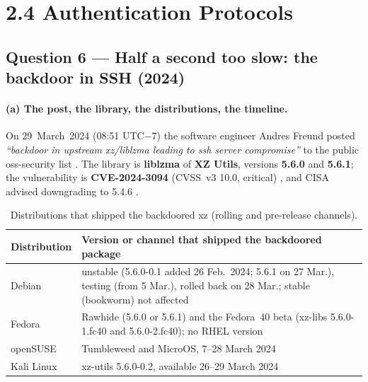 \documentclass[11pt,a4paper]{article}
\begin{document}
\section*{2.4 Authentication Protocols}

\subsection*{Question 6 --- Half a second too slow: the backdoor in SSH (2024)}

\paragraph{(a) The post, the library, the distributions, the timeline.} On 29~March~2024 (08:51 UTC$-$7) the software engineer
Andres Freund posted \emph{``backdoor in upstream xz/liblzma leading to ssh server compromise''} to the public oss-security
list \cite{freund}. The library is \textbf{liblzma} of \textbf{XZ Utils}, versions \textbf{5.6.0} and \textbf{5.6.1}; the
vulnerability is \textbf{CVE-2024-3094} (CVSS~v3 10.0, critical) \cite{nvd}, and CISA advised downgrading to 5.4.6 \cite{cisaxz}.
\begin{table}[H]
\centering\small
\begin{tabularx}{\textwidth}{@{}P{3.4cm}L@{}}
\toprule
Distribution & Version or channel that shipped the backdoored package \\
\midrule
Debian & unstable (5.6.0-0.1 added 26 Feb.\ 2024; 5.6.1 on 27 Mar.), testing (from 5 Mar.), rolled back on 28 Mar.; stable (bookworm) not affected
\cite{cox,debian} \\
Fedora & Rawhide (5.6.0 or 5.6.1) and the Fedora~40 beta (xz-libs 5.6.0-1.fc40 and 5.6.0-2.fc40); no RHEL version \cite{redhat} \\
openSUSE & Tumbleweed and MicroOS, 7--28 March 2024 \cite{suse} \\
Kali Linux & xz-utils 5.6.0-0.2, available 26--29 March 2024 \cite{kali} \\
\bottomrule
\end{tabularx}
\caption{Distributions that shipped the backdoored xz (rolling and pre-release channels).}\label{tab:distros}
\end{table}
\end{document}
